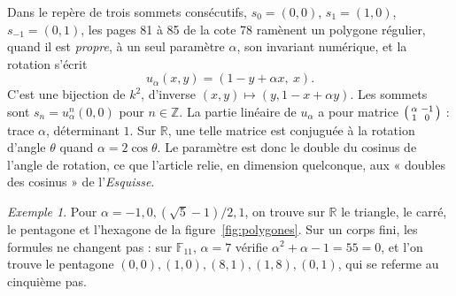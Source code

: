 \documentclass[11pt,a4paper]{amsart}
\theoremstyle{definition}
\theoremstyle{plain}
\theoremstyle{remark}
\newtheorem{exemple}{Exemple}
\newcommand{\Z}{\mathbb Z}
\newcommand{\F}{\mathbb F}
\newcommand{\R}{\mathbb R}
\begin{document}
Dans le repère de trois sommets consécutifs, $s_0 = (0,0)$, $s_1 = (1,0)$, $s_{-1} = (0,1)$, les pages 81 à 85 de la cote 78 ramènent un polygone régulier, quand il est \emph{propre}, à un seul paramètre $\alpha$, son invariant numérique, et la rotation s'écrit
\[
u_\alpha(x, y) = (1 - y + \alpha x,\ x).
\]
C'est une bijection de $k^2$, d'inverse $(x, y) \mapsto (y, 1 - x + \alpha y)$. Les sommets sont $s_n = u_\alpha^n(0,0)$ pour $n \in \Z$. La partie linéaire de $u_\alpha$ a pour matrice $\begin{psmallmatrix} \alpha & -1 \\ 1 & 0 \end{psmallmatrix}$ : trace $\alpha$, déterminant $1$. Sur $\R$, une telle matrice est conjuguée à la rotation d'angle $\theta$ quand $\alpha = 2\cos\theta$. Le paramètre est donc le double du cosinus de l'angle de rotation, ce que l'article relie, en dimension quelconque, aux « doubles des cosinus » de l'\emph{Esquisse}.

\begin{exemple}
Pour $\alpha = -1, 0, (\sqrt5-1)/2, 1$, on trouve sur $\R$ le triangle, le carré, le pentagone et l'hexagone de la figure~\ref{fig:polygones}. Sur un corps fini, les formules ne changent pas : sur $\F_{11}$, $\alpha = 7$ vérifie $\alpha^2 + \alpha - 1 = 55 = 0$, et l'on trouve le pentagone $(0,0), (1,0), (8,1), (1,8), (0,1)$, qui se referme au cinquième pas.
\end{exemple}
\end{document}
